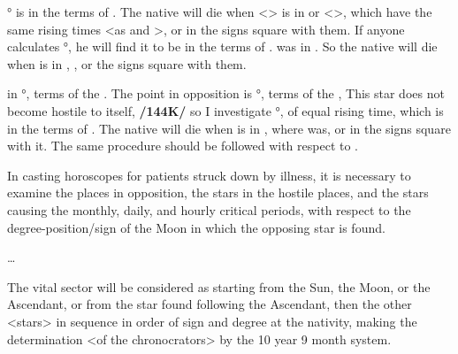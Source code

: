 \Gemini\xspace 27° is in the terms of \Venus. The native will die when <\Mars> is in \Scorpio\xspace or <\Pisces>, which have the same rising times <as \Leo\xspace and \Taurus>, or in the signs square with them. If anyone calculates \Leo\xspace 27°, he will find it to be in the terms of \Saturn. \Saturn\xspace was in \Cancer. So the native will die when \Mars\xspace is in \Cancer, \Sagittarius, or the signs square with them.

\Venus\xspace in \Scorpio\xspace 27°, terms of the \Sun. The point in opposition is \Taurus\xspace 27°, terms of the \Sun,
This star does not become hostile to itself, \textbf{/144K/} so I investigate \Scorpio\xspace 27°, of equal rising time,
which is in the terms of \Mercury. The native will die when \Venus\xspace is in \Virgo, where \Mercury\xspace was, or in the signs square with it. The same procedure should be followed with respect to \Mercury.

In casting horoscopes for patients struck down by illness, it is necessary to examine the places in opposition, the stars in the hostile places, and the stars causing the monthly, daily, and hourly critical periods, with respect to the degree-position/sign of the Moon in which the opposing star is found.

\ldots

The vital sector will be considered as starting from the Sun, the Moon, or the Ascendant, or from the star found following the Ascendant, then the other <stars> in sequence in order of sign and degree at the nativity, making the determination <of the chronocrators> by the 10 year 9 month system.


\newpage
